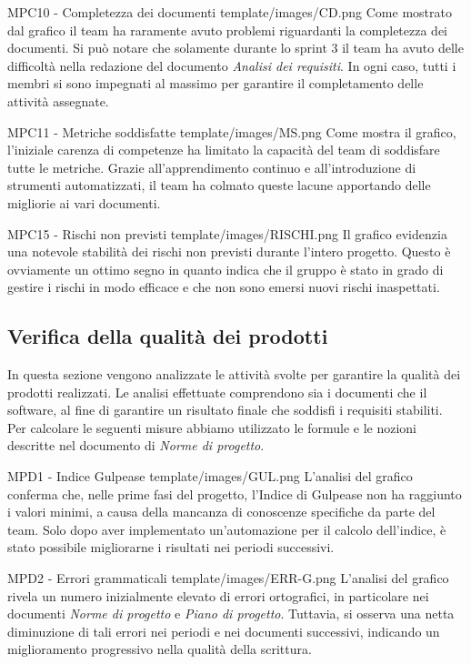 \Met
{ %
    MPC10 - Completezza dei documenti
}
{ %
    template/images/CD.png
}
{ %
    Come mostrato dal grafico il team ha raramente avuto problemi riguardanti la completezza dei documenti.
    Si può notare che solamente durante lo sprint 3 il team ha avuto delle difficoltà nella redazione del documento \textit{Analisi dei requisiti}.
    In ogni caso, tutti i membri si sono impegnati al massimo per garantire il completamento delle attività assegnate.
}

\Met
{ %
    MPC11 - Metriche soddisfatte
}
{ %
    template/images/MS.png
}
{ %
    Come mostra il grafico, l'iniziale carenza di competenze ha limitato la capacità del team di soddisfare tutte le metriche.
    Grazie all'apprendimento continuo e all'introduzione di strumenti automatizzati, il team ha colmato queste lacune apportando delle migliorie ai vari documenti.
}

\Met
{ %
    MPC15 - Rischi non previsti
}
{ %
    template/images/RISCHI.png
}
{ %
    Il grafico evidenzia una notevole stabilità dei rischi non previsti durante l'intero progetto.
    Questo è ovviamente un ottimo segno in quanto indica che il gruppo è stato in grado di gestire i rischi in modo efficace e che non sono 
    emersi nuovi rischi inaspettati.
}

\subsection{Verifica della qualità dei prodotti}
In questa sezione vengono analizzate le attività svolte per garantire la qualità dei prodotti realizzati.
 Le analisi effettuate comprendono sia i documenti che il software, al fine di garantire un risultato finale che soddisfi i requisiti stabiliti.\\
Per calcolare le seguenti misure abbiamo utilizzato le formule e le nozioni descritte nel documento di \textit{Norme di progetto}.

\Met
{ %
    MPD1 - Indice Gulpease
}
{ %
    template/images/GUL.png
}
{ %
    L'analisi del grafico conferma che, nelle prime fasi del progetto, l'Indice di Gulpease non ha raggiunto i valori minimi, a causa della mancanza di conoscenze specifiche da parte del team.
    Solo dopo aver implementato un'automazione per il calcolo dell'indice, è stato possibile migliorarne i risultati nei periodi successivi.
}

\Met
{ %
    MPD2 - Errori grammaticali
}
{ %
    template/images/ERR-G.png
}
{ %
    L'analisi del grafico rivela un numero inizialmente elevato di errori ortografici, in particolare nei documenti \textit{Norme di progetto} e \textit{Piano di progetto}.
    Tuttavia, si osserva una netta diminuzione di tali errori nei periodi e nei documenti successivi, indicando un miglioramento progressivo nella qualità della scrittura.
}



